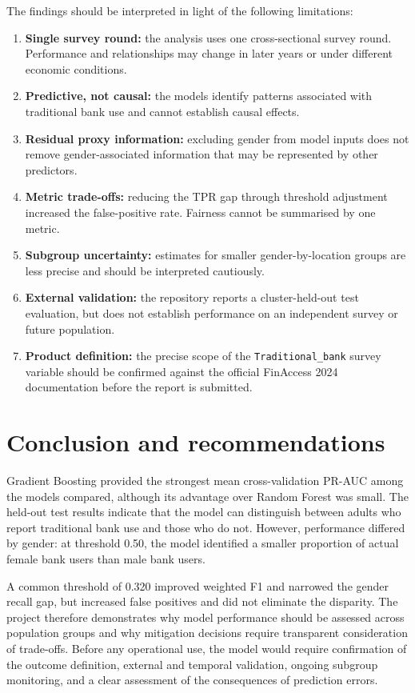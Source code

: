 \documentclass[11pt,a4paper]{article}
\begin{document}
The findings should be interpreted in light of the following limitations:
\begin{enumerate}[leftmargin=*]
  \item \textbf{Single survey round:} the analysis uses one cross-sectional survey round. Performance and relationships may change in later years or under different economic conditions.
  \item \textbf{Predictive, not causal:} the models identify patterns associated with traditional bank use and cannot establish causal effects.
  \item \textbf{Residual proxy information:} excluding gender from model inputs does not remove gender-associated information that may be represented by other predictors.
  \item \textbf{Metric trade-offs:} reducing the TPR gap through threshold adjustment increased the false-positive rate. Fairness cannot be summarised by one metric.
  \item \textbf{Subgroup uncertainty:} estimates for smaller gender-by-location groups are less precise and should be interpreted cautiously.
  \item \textbf{External validation:} the repository reports a cluster-held-out test evaluation, but does not establish performance on an independent survey or future population.
  \item \textbf{Product definition:} the precise scope of the \texttt{Traditional\_bank} survey variable should be confirmed against the official FinAccess 2024 documentation before the report is submitted.
\end{enumerate}

\section{Conclusion and recommendations}

Gradient Boosting provided the strongest mean cross-validation PR-AUC among the models compared, although its advantage over Random Forest was small. The held-out test results indicate that the model can distinguish between adults who report traditional bank use and those who do not. However, performance differed by gender: at threshold 0.50, the model identified a smaller proportion of actual female bank users than male bank users.

A common threshold of 0.320 improved weighted F1 and narrowed the gender recall gap, but increased false positives and did not eliminate the disparity. The project therefore demonstrates why model performance should be assessed across population groups and why mitigation decisions require transparent consideration of trade-offs. Before any operational use, the model would require confirmation of the outcome definition, external and temporal validation, ongoing subgroup monitoring, and a clear assessment of the consequences of prediction errors.
\end{document}
